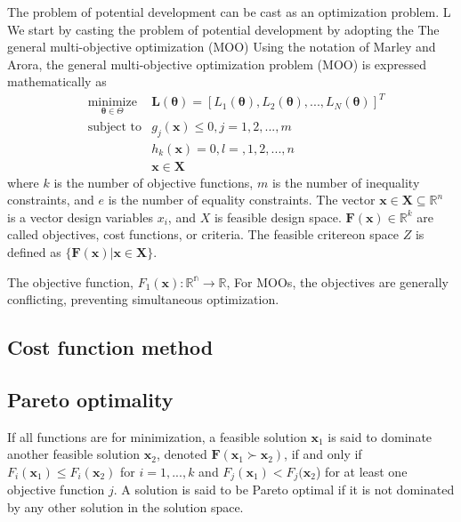 The problem of potential development can be cast as an optimization problem.  L
We start by casting the problem of potential development by adopting the The general multi-objective optimization (MOO)
Using the notation of Marley and Arora\cite{marler2004_moo_survey}, the general multi-objective optimization problem (MOO) is expressed mathematically as
\begin{align}
  & \underset{\bm{\theta}\in\Theta}{\text{minimize}}
        &\bm{L}(\bm{\theta}) = [
            L_1(\bm{\theta}),
            L_2(\bm{\theta}),
            ...,
            L_N(\bm{\theta})]^T\\
  & \text{subject to}
        &g_j(\bm{x}) \leq 0, j=1,2,...,m \\
  &     &h_k(\bm{x}) = 0, l=,1,2,...,n \\
  &     &\bm{x} \in \bm{X}
\end{align}
where $k$ is the number of objective functions, $m$ is the number of inequality constraints, and $e$ is the number of equality constraints.
The vector $\bm{x} \in \bm{X} \subseteq \mathbb{R}^n$ is a vector design variables $x_i$, and $X$ is feasible design space.
$\bm{F}(\bm{x}) \in \mathbb{R}^k$ are called objectives, cost functions, or criteria.  The feasible critereon space $Z$ is defined as
$\{\bm{F}(\bm{x}) | \bm{x} \in \bm{X} \}$.

The objective function,
    $F_1(\bm{x}):\mathbb{R^n} \rightarrow \mathbb{R}$,
For MOOs, the objectives are generally conflicting, preventing simultaneous optimization.

\subsection{Cost function method}

\subsection{Pareto optimality}

If all functions are for minimization, a feasible solution $\bm{x}_1$ is said to dominate another feasible solution $\bm{x}_2$, denoted $\bm{F}(\bm{x}_1 \succ \bm{x}_2)$, if and only if $F_i(\bm{x}_1)\leq F_i(\bm{x}_2)$ for $i = 1,...,k$ and $F_j(\bm{x}_1)< F_j(\bm{x}_2$) for at least one objective function $j$.  A solution is said to be Pareto optimal if it is not dominated by any other solution in the solution space.

